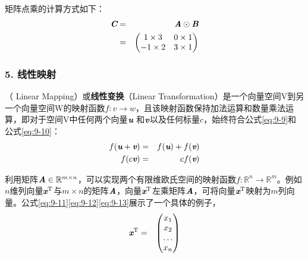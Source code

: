 \parinterval 矩阵点乘的计算方式如下：
\begin{eqnarray}
{\textbf{\em C}} & = & {\textbf{\em A}}\odot {\textbf{\em B}} \nonumber \\
          & = & \begin{pmatrix}
   1\times 3 & 0\times1\\
   -1\times2 & 3\times1
\end{pmatrix}
\label{eq:9-8}
\end{eqnarray}


\subsubsection{5. 线性映射}

（ Linear Mapping）或{\small\sffamily\bfseries{线性变换}}（Linear Transformation）是一个向量空间V到另一个向量空间W的映射函数$ f:v\rightarrow w$，且该映射函数保持加法运算和数量乘法运算，即对于空间V中任何两个向量$ {\textbf{\em u}} $ 和$ {\textbf{\em v}} $以及任何标量$ c $，始终符合公式\eqref{eq:9-9}和公式\eqref{eq:9-10}：
\begin{eqnarray}
f({\textbf{\em u}}+{\textbf{\em v}})&=&f({\textbf{\em u}})+f({\textbf{\em v}})\label{eq:9-9}\\
f(c{\textbf{\em v}})&=&cf({\textbf{\em v}})
\label{eq:9-10}
\end{eqnarray}

\parinterval 利用矩阵$ {\textbf{\em A}}\in {\mathbb R}^{m\times n} $，可以实现两个有限维欧氏空间的映射函数$f:{\mathbb R}^n\rightarrow {\mathbb R}^m$。例如$ n $维列向量$ {\textbf{\em x}} ^{\textrm T}$与$ m\times n $的矩阵$ {\textbf{\em A}} $，向量$ {\textbf{\em x}} ^{\textrm T}$左乘矩阵$ {\textbf{\em A}} $，可将向量$ {\textbf{\em x}} ^{\textrm T}$映射为$ m $列向量。公式\eqref{eq:9-11}\eqref{eq:9-12}\eqref{eq:9-13}展示了一个具体的例子，
\begin{eqnarray}
{\textbf{\em x}}^{\textrm{T}} & = & {\begin{pmatrix} x_1\\ x_2 \\  \dots  \\ x_n \end{pmatrix}}
\label{eq:9-11}
\end{eqnarray}

